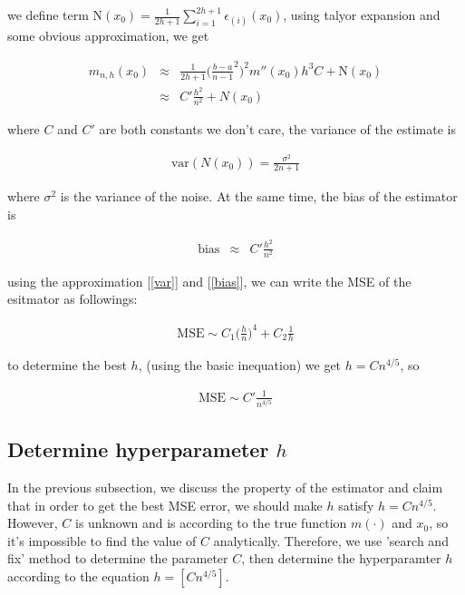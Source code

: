 \documentclass[twoside]{article}
\begin{document}
we define term $\mathrm{N}(x_0)=\frac{1}{2h+1}\sum_{i=1}^{2h+1}{\epsilon_{(i)}(x_0)}$, using talyor expansion and some obvious approximation, we get

\begin{eqnarray}
  \hat{m}_{n,h}(x_0)&\approx&\frac{1}{2h+1}\big(\frac{b-a}{n-1}^2\big)^2m''(x_0)h^3C+\mathrm{N}(x_0) \nonumber \\
  &\approx&C'\frac{h^2}{n^2}+N(x_0)
\end{eqnarray} 

where $C$ and $C'$ are both constants we don't care, the variance of the estimate is

\begin{eqnarray}
\label{var}
  \mathrm{var}(N(x_0))=\frac{\sigma^2}{2n+1}
\end{eqnarray}

where $\sigma^2$ is the variance of the noise. At the same time, the bias of the estimator is 

\begin{eqnarray}
\label{bias}
  \mathrm{bias}&\approx&C'\frac{h^2}{n^2}
\end{eqnarray}

using the approximation [\ref{var}] and [\ref{bias}], we can write the MSE of the esitmator as followings:

\begin{eqnarray}
\label{mse}
  \mathrm{MSE} \sim C_1\big(\frac{h}{n}\big)^4+C_2\frac{1}{h}
\end{eqnarray}

to determine the best $h$, (using the basic inequation) we get $h=Cn^{4/5}$, so

\begin{eqnarray}
\label{msef}
  \mathrm{MSE} \sim C'\frac{1}{n^{4/5}}
\end{eqnarray}

\subsection{Determine hyperparameter $h$}

In the previous subsection, we discuss the property of the estimator and claim that in order to get the best MSE error, we should make $h$ satisfy $h=Cn^{4/5}$. However, $C$ is unknown and is according to the true function $m(\cdot)$ and $x_0$, so it's impossible to find the value of $C$ analytically. Therefore, we use 'search and fix' method to determine the parameter $C$, then determine the hyperparamter $h$ according to the equation $h=[Cn^{4/5}]$.
\end{document}
